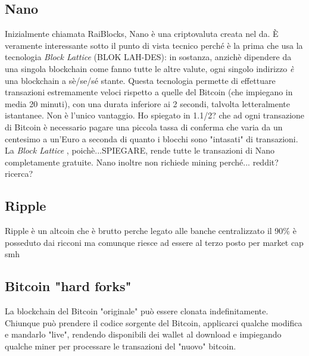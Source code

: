 \documentclass {article}
\begin{document}
{\subsection {Nano}


Inizialmente chiamata RaiBlocks, Nano è una criptovaluta creata nel da.
È veramente interessante sotto il punto di vista tecnico perché è la prima che usa la tecnologia \textit{Block Lattice} (BLOK LAH-DES): in sostanza, anzichè dipendere da una singola blockchain come fanno tutte le altre valute, ogni singolo indirizzo \emph{è} una blockchain a sè/se/sé stante.
Questa tecnologia permette di effettuare transazioni estremamente veloci rispetto a quelle del Bitcoin (che impiegano in media 20 minuti), con una durata inferiore ai 2 secondi, talvolta letteralmente istantanee.
Non è l'unico vantaggio. Ho spiegato in 1.1/2? che ad ogni transazione di Bitcoin è necessario pagare una piccola tassa di conferma che varia da un centesimo a un'Euro a seconda di quanto i blocchi sono "intasati" di transazioni.
La \textit{Block Lattice} , poichè...SPIEGARE, rende tutte le transazioni di Nano completamente gratuite.
Nano inoltre non richiede mining perché... reddit? ricerca?


\subsection {Ripple}


Ripple è un altcoin che è brutto perche legato alle banche centralizzato il 90\% è posseduto dai ricconi ma comunque riesce ad essere al terzo posto per market cap smh


\subsection {Bitcoin "hard forks"}


La blockchain del Bitcoin "originale" può essere clonata indefinitamente. Chiunque può prendere il codice sorgente del Bitcoin, applicarci qualche modifica e mandarlo "live", rendendo disponibili dei wallet al download e impiegando qualche miner per processare le transazioni del "nuovo" bitcoin.

}
\end{document}
